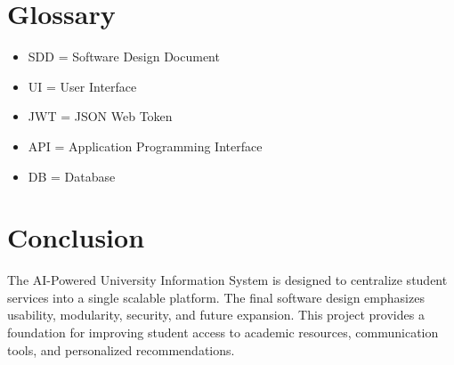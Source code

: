 \documentclass[12pt]{article}
\begin{document}
\section{Glossary}

\begin{itemize}
\item SDD = Software Design Document
\item UI = User Interface
\item JWT = JSON Web Token
\item API = Application Programming Interface
\item DB = Database
\end{itemize}

\section{Conclusion}

The AI-Powered University Information System is designed to centralize student services into a single scalable platform.
The final software design emphasizes usability, modularity, security, and future expansion.
This project provides a foundation for improving student access to academic resources, communication tools, and personalized recommendations.
\end{document}
